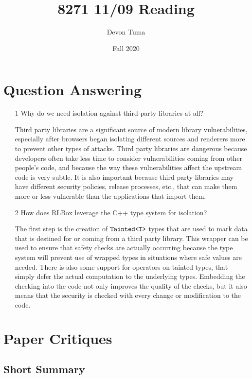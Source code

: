 \documentclass[11pt]{article}
\title{8271 11/09 Reading}
\author{Devon Tuma}
\date{Fall 2020}
\begin{document}
\maketitle

\section*{Question Answering}

\begin{itemize}
\item [1] Why do we need isolation against third-party libraries at all?

  Third party libraries are a significant source of modern library vulnerabilities, especially after browsers began isolating different sources and renderers more to prevent other types of attacks.
  Third party libraries are dangerous because developers often take less time to consider vulnerabilities coming from other people's code, and because the way these vulnerabilities affect the upstream code is very subtle.
  It is also important because third party libraries may have different security policies, release processes, etc., that can make them more or less vulnerable than the applications that import them.
  
\item [2] How does RLBox leverage the C++ type system for isolation?

  The first step is the creation of $\verb|Tainted<T>|$ types that are used to mark data that is destined for or coming from a third party library.
  This wrapper can be used to ensure that safety checks are actually occurring because the type system will prevent use of wrapped types in situations where safe values are needed.
  There is also some support for operators on tainted types, that simply defer the actual computation to the underlying types.
  Embedding the checking into the code not only improves the quality of the checks, but it also means that the security is checked with every change or modification to the code.
  
\end{itemize}

\section*{Paper Critiques}

\subsection*{Short Summary}
\end{document}
